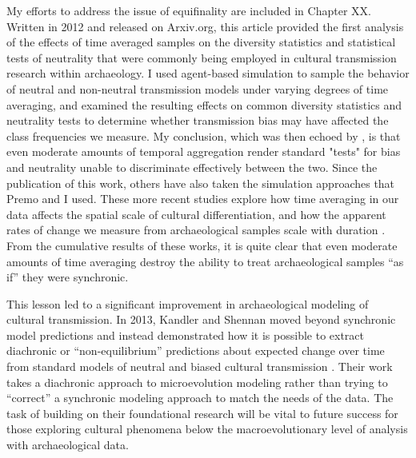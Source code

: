 My efforts to address the issue of equifinality are included in Chapter XX. Written in 2012 and released on Arxiv.org, this article provided the first analysis of the effects of time averaged samples on the diversity statistics and statistical tests of neutrality that were commonly being employed in cultural transmission research within archaeology. I used agent-based simulation to sample the behavior of neutral and non-neutral transmission models under varying degrees of time averaging, and examined the resulting effects on common diversity statistics and neutrality tests to determine whether transmission bias may have affected the class frequencies we measure. My conclusion, which was then echoed by \citet{Premo2014}, is that even moderate amounts of temporal aggregation render standard "tests" for bias and neutrality unable to discriminate effectively between the two. Since the publication of this work, others have also taken the simulation approaches that Premo and I used. These more recent studies explore how time averaging in our data affects the spatial scale of cultural differentiation, and how the apparent rates of change we measure from archaeological samples scale with duration \citep{miller2018time,perreault2018time}. From the cumulative results of these works, it is quite clear that even moderate amounts of time averaging destroy the ability to treat archaeological samples ``as if'' they were synchronic.

This lesson led to a significant improvement in archaeological modeling of cultural transmission. In 2013, Kandler and Shennan \citeyearpar{Kandler2013} moved beyond synchronic model predictions and  instead demonstrated how it is possible to extract diachronic or “non-equilibrium” predictions about expected change over time from standard models of neutral and biased cultural transmission . Their work takes a diachronic approach to microevolution modeling rather than trying to “correct” a synchronic modeling approach to match the needs of the data.  The task of building on their foundational research will be vital to future success for those exploring cultural phenomena below the macroevolutionary level of analysis with archaeological data.

